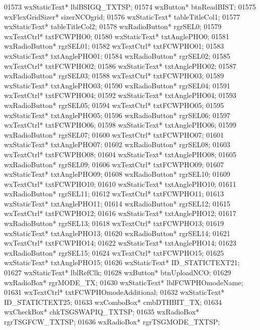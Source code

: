 \begin{DoxyCode}
01573         wxStaticText* lblBSIGQ_TXTSP;
01574         wxButton* btnReadBIST;
01575         wxFlexGridSizer* sizerNCOgrid;
01576         wxStaticText* tableTitleCol1;
01577         wxStaticText* tableTitleCol2;
01578         wxRadioButton* rgrSEL0;
01579         wxTextCtrl* txtFCWPHO0;
01580         wxStaticText* txtAnglePHO0;
01581         wxRadioButton* rgrSEL01;
01582         wxTextCtrl* txtFCWPHO01;
01583         wxStaticText* txtAnglePHO01;
01584         wxRadioButton* rgrSEL02;
01585         wxTextCtrl* txtFCWPHO02;
01586         wxStaticText* txtAnglePHO02;
01587         wxRadioButton* rgrSEL03;
01588         wxTextCtrl* txtFCWPHO03;
01589         wxStaticText* txtAnglePHO03;
01590         wxRadioButton* rgrSEL04;
01591         wxTextCtrl* txtFCWPHO04;
01592         wxStaticText* txtAnglePHO04;
01593         wxRadioButton* rgrSEL05;
01594         wxTextCtrl* txtFCWPHO05;
01595         wxStaticText* txtAnglePHO05;
01596         wxRadioButton* rgrSEL06;
01597         wxTextCtrl* txtFCWPHO06;
01598         wxStaticText* txtAnglePHO06;
01599         wxRadioButton* rgrSEL07;
01600         wxTextCtrl* txtFCWPHO07;
01601         wxStaticText* txtAnglePHO07;
01602         wxRadioButton* rgrSEL08;
01603         wxTextCtrl* txtFCWPHO08;
01604         wxStaticText* txtAnglePHO08;
01605         wxRadioButton* rgrSEL09;
01606         wxTextCtrl* txtFCWPHO09;
01607         wxStaticText* txtAnglePHO09;
01608         wxRadioButton* rgrSEL10;
01609         wxTextCtrl* txtFCWPHO10;
01610         wxStaticText* txtAnglePHO10;
01611         wxRadioButton* rgrSEL11;
01612         wxTextCtrl* txtFCWPHO11;
01613         wxStaticText* txtAnglePHO11;
01614         wxRadioButton* rgrSEL12;
01615         wxTextCtrl* txtFCWPHO12;
01616         wxStaticText* txtAnglePHO12;
01617         wxRadioButton* rgrSEL13;
01618         wxTextCtrl* txtFCWPHO13;
01619         wxStaticText* txtAnglePHO13;
01620         wxRadioButton* rgrSEL14;
01621         wxTextCtrl* txtFCWPHO14;
01622         wxStaticText* txtAnglePHO14;
01623         wxRadioButton* rgrSEL15;
01624         wxTextCtrl* txtFCWPHO15;
01625         wxStaticText* txtAnglePHO15;
01626         wxStaticText* ID_STATICTEXT21;
01627         wxStaticText* lblRefClk;
01628         wxButton* btnUploadNCO;
01629         wxRadioBox* rgrMODE_TX;
01630         wxStaticText* lblFCWPHOmodeName;
01631         wxTextCtrl* txtFCWPHOmodeAdditional;
01632         wxStaticText* ID_STATICTEXT25;
01633         wxComboBox* cmbDTHBIT_TX;
01634         wxCheckBox* chkTSGSWAPIQ_TXTSP;
01635         wxRadioBox* rgrTSGFCW_TXTSP;
01636         wxRadioBox* rgrTSGMODE_TXTSP;

\end{DoxyCode}
